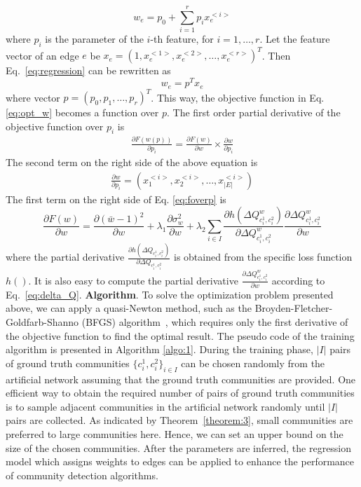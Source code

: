 \begin{equation} \label{eq:regression}
w_e = p_0 + \sum_{i=1}^{r} p_i x_{e}^{<i>}
\end{equation}
where $p_i$ is the parameter of the $i$-th feature, for $i=1,\ldots,r$. Let the feature vector of an edge $e$ be $x_e = (1,x_e^{<1>},x_e^{<2>},\ldots,x_e^{<r>})^T$. Then Eq.~\ref{eq:regression} can be rewritten as
\begin{equation} 
w_e = p^T x_{e}
\end{equation}
where vector $p=(p_0,p_1,\ldots,p_r)^T$. This way, the objective function in Eq. \ref{eq:opt_w} becomes a function over $p$.
The first order partial derivative of the objective function over $p_i$ is
\begin{align} \label{eq:foverp}
\frac{ \partial F(w(p))}{\partial p_i} = \frac{ \partial F(w)}{\partial w} \times \frac{ \partial w}{\partial p_i}
\end{align}
The second term on the right side of the above equation is
\begin{align} \label{eq:woverp}
\frac{ \partial w}{\partial p_i} = \left(  x^{<i>}_1,x^{<i>}_2,\ldots,x^{<i>}_{|E|} \right)
\end{align}
The first term on the right side of Eq. \ref{eq:foverp} is
\begin{equation} \label{eq:foverw}
\frac{ \partial F(w)}{\partial w} = \frac{\partial (\bar w - 1)^2 }{\partial w} + \lambda_1 \frac{\partial \sigma_w^2 }{\partial w} + \lambda_2 \sum_{i \in I} \frac{ \partial h(\Delta Q^w_{c_i^1, c_i^2})}{\partial \Delta Q^w_{c_i^1, c_i^2} } \frac{ \partial \Delta Q^w_{c_i^1, c_i^2}}{\partial w} 
\end{equation}
where the partial derivative $\frac{ \partial h(\Delta Q_{c_i^1, c_i^2})}{\partial \Delta Q_{c_i^1, c_i^2} }$ is obtained from the specific loss function $h()$. It is also easy to compute the partial derivative $\frac{ \partial \Delta Q^w_{c_i^1, c_i^2}}{\partial w} $ according to Eq.~\ref{eq:delta_Q}.
\textbf{Algorithm}. To solve the optimization problem presented above, we can apply a quasi-Newton method, such as the Broyden-Fletcher-Goldfarb-Shanno (BFGS) algorithm~\cite{nocedal2006numerical}, which requires only the first derivative of the objective function to find the optimal result. The pseudo code of the training algorithm is presented in Algorithm \ref{algo:1}.
During the training phase, $|I|$ pairs of ground truth communities $\{c_i^1,c_i^2\}_{i \in I}$ can be chosen randomly from the artificial network assuming that the ground truth communities are provided. One efficient way to obtain the required number of pairs of ground truth communities is to sample adjacent communities in the artificial network randomly until $|I|$ pairs are collected. As indicated by Theorem~\ref{theorem:3}, small communities are preferred to large communities here. Hence, we can set an upper bound on the size of the chosen communities. After the parameters are inferred, the regression model which assigns weights to edges can be applied to enhance the performance of community detection algorithms.

